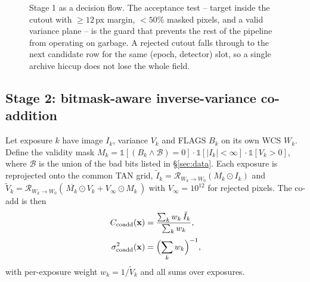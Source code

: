 \documentclass[11pt,a4paper]{article}
\begin{document}
\begin{figure}[H]
{}
\caption{Stage 1 as a decision flow. The acceptance test -- target inside the cutout with
$\ge 12$\,px margin, $<50\%$ masked pixels, and a valid variance plane -- is the guard that
prevents the rest of the pipeline from operating on garbage. A rejected cutout falls through to
the next candidate row for the same (epoch, detector) slot, so a single archive hiccup does not
lose the whole field.}
\label{fig:ingestflow}
\end{figure}

\subsection{Stage 2: bitmask-aware inverse-variance co-addition}
\label{sec:coadd}

Let exposure $k$ have image $I_k$, variance $V_k$ and FLAGS $B_k$ on its own WCS $W_k$. Define the
validity mask $M_k = \mathbb{1}[(B_k \wedge \mathcal{B}) = 0] \cdot \mathbb{1}[|I_k| < \infty]
\cdot \mathbb{1}[V_k > 0]$, where $\mathcal{B}$ is the union of the bad bits listed in
\S\ref{sec:data}. Each exposure is reprojected onto the common TAN grid,
$\tilde I_k = \mathcal{R}_{W_k \to W_0}(M_k \odot I_k)$ and
$\tilde V_k = \mathcal{R}_{W_k \to W_0}(\,\overline{M_k} \odot V_k + V_{\infty} \odot M_k\,)$
with $V_\infty = 10^{12}$ for rejected pixels. The co-add is then
\begin{equation}
\begin{aligned}
  C_{\mathrm{coadd}}(\mathbf{x}) &= \frac{\sum_k w_k\,\tilde I_k}{\sum_k w_k}, \\[2pt]
  \sigma^2_{\mathrm{coadd}}(\mathbf{x}) &= \Bigl(\sum_k w_k\Bigr)^{-1},
\end{aligned}
\label{eq:coadd}
\end{equation}
with per-exposure weight $w_k = 1/\tilde V_k$ and all sums over exposures.
\end{document}
